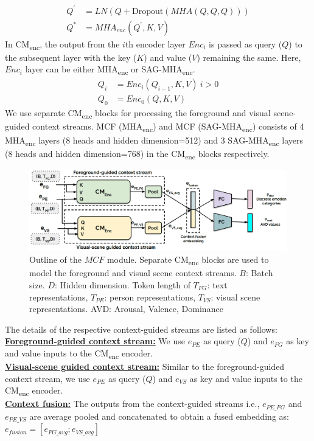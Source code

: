 \begin{equation} \label{SAG-MHAEnc operation}
\begin{split}
 Q^{'} & = LN(Q + \text{Dropout}(MHA(Q,Q,Q))) \\ 
Q^{*} & = MHA_{enc}( Q^{'},K,V) 
\end{split}
\end{equation}
In CM\textsubscript{enc}, the output from the $i$th encoder layer $Enc_{i}$ is passed as query ($Q$) to the subsequent layer with the key ($K$) and value ($V$) remaining the same. Here, $Enc_{i}$ layer can be either MHA\textsubscript{enc} or SAG-MHA\textsubscript{enc}.
\begin{equation} \label{encoder layer operation}
\begin{split}
    Q_{i}&=Enc_{i}(Q_{i-1},K,V) \     i > 0 \\
    Q_{0} &=Enc_{0}(Q,K,V)
\end{split}
\end{equation}
We use separate CM\textsubscript{enc} blocks for processing the foreground and visual scene-guided context streams. MCF (MHA\textsubscript{enc}) and MCF (SAG-MHA\textsubscript{enc}) consists of 4 MHA\textsubscript{enc} layers (8 heads and hidden dimension=512) and 3 SAG-MHA\textsubscript{enc} layers (8 heads and hidden dimension=768) in the CM\textsubscript{enc} blocks respectively.
\begin{figure}[h!]
    \centering
    \includegraphics[width=\columnwidth]{figures/MCF_module_updated.png}
    \caption{Outline of the $MCF$ module. Separate CM\textsubscript{enc} blocks are used to model the foreground and visual scene context streams. $B$: Batch size. $D$: Hidden dimension. Token length of $T_{FG}$: text representations, $T_{PE}$: person representations, $T_{VS}$: visual scene representations. AVD: Arousal, Valence, Dominance
    }
    \label{mcf module}
\end{figure}
The details of the respective context-guided streams are listed as follows:\\
\textbf{\underline{Foreground-guided context stream:}} We use $e_{PE}$ as query ($Q$) and $e_{FG}$ as key and value inputs to the CM\textsubscript{enc} encoder.\\
\textbf{\underline{Visual-scene guided context stream:}} Similar to the foreground-guided context stream, we use $e_{PE}$ as query ($Q$) and $e_{VS}$ as key and value inputs to the CM\textsubscript{enc} encoder.\\
\textbf{\underline{Context fusion:}}
The outputs from the context-guided streams i.e., $e_{PE\_{FG}}$ and $e_{PE\_{VS}}$ are average pooled and concatenated to obtain a fused embedding as: $e_{fusion}=[e_{FG\_{avg}};e_{VS\_{avg}}]$
